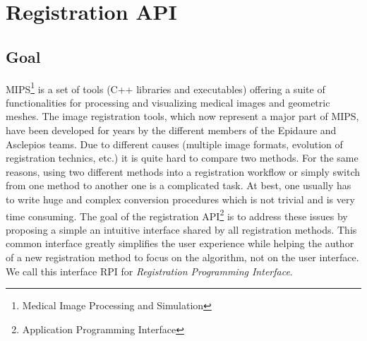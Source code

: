 \chapter{Registration API}


\section{Goal}

MIPS\footnote{Medical Image Processing and Simulation} is a set of tools (C++ libraries and executables) offering a suite of functionalities for processing and visualizing medical images and geometric meshes. The image registration tools, which now represent a major part of MIPS, have been developed for years by the different members of the Epidaure and Asclepios teams. Due to different causes (multiple image formats, evolution of registration technics, etc.) it is quite hard to compare two methods. For the same reasons, using two different methods into a registration workflow or simply switch from one method to another one is a complicated task. At best, one usually has to write huge and complex conversion procedures which is not trivial and is very time consuming. The goal of the registration API\footnote{Application Programming Interface} is to address these issues by proposing a simple an intuitive interface shared by all registration methods. This common interface greatly simplifies the user experience while helping the author of a new registration method to focus on the algorithm, not on the user interface. We call this interface RPI for \textit{Registration Programming Interface}.















